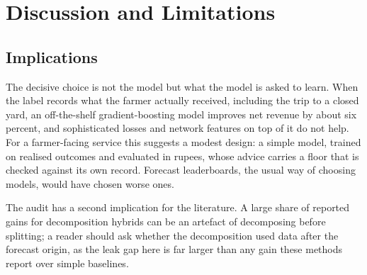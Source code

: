 \documentclass{ieeeaccess}
\begin{document}
\section{Discussion and Limitations}
\label{sec:discussion}
\subsection{Implications}
The decisive choice is not the model but what the model is asked to learn. When the label records what the farmer actually received, including the trip to a closed yard, an off-the-shelf gradient-boosting model improves net revenue by about six percent, and sophisticated losses and network features on top of it do not help. For a farmer-facing service this suggests a modest design: a simple model, trained on realised outcomes and evaluated in rupees, whose advice carries a floor that is checked against its own record. Forecast leaderboards, the usual way of choosing models, would have chosen worse ones.

The audit has a second implication for the literature. A large share of reported gains for decomposition hybrids can be an artefact of decomposing before splitting; a reader should ask whether the decomposition used data after the forecast origin, as the leak gap here is far larger than any gain these methods report over simple baselines.
\end{document}
